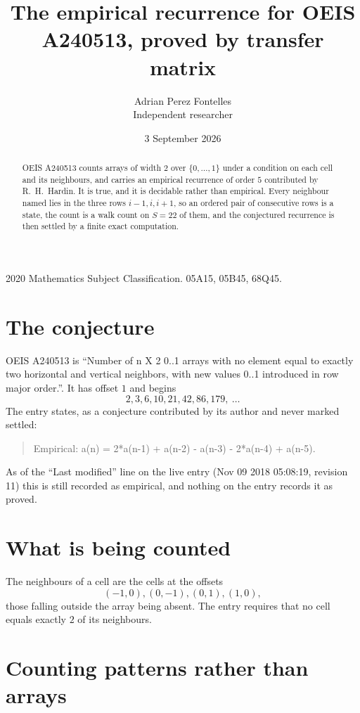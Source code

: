 \documentclass[11pt,a4paper]{article}
\title{The empirical recurrence for OEIS A240513, proved by transfer matrix}
\author{Adrian Perez Fontelles\\ \small Independent researcher}
\date{3 September 2026}
\theoremstyle{plain}
\theoremstyle{definition}
\begin{document}
\maketitle

\begin{abstract}
OEIS A240513 counts arrays of width $2$ over $\{0,\dots,1\}$ under a condition on each cell
and its neighbours, and carries an empirical recurrence of order $5$ contributed by
R.~H.~Hardin. It is true, and it is decidable rather than empirical. Every neighbour named lies
in the three rows $i-1,i,i+1$, so an ordered pair of consecutive rows is a state, the count is
a walk count on $S=22$ of them, and the conjectured recurrence is then settled by a finite
exact computation.
\end{abstract}

\noindent\small 2020 Mathematics Subject Classification. 05A15, 05B45, 68Q45.\normalsize

\section{The conjecture}

OEIS A240513 is ``Number of n X 2 0..1 arrays with no element equal to exactly two horizontal and vertical neighbors, with new values 0..1 introduced in row major order.''. It has offset $1$ and begins
\[
2, 3, 6, 10, 21, 42, 86, 179,\ \dots
\]
The entry states, as a conjecture contributed by its author and never marked settled:
\begin{quote}
Empirical: a(n) = 2*a(n-1) + a(n-2) - a(n-3) - 2*a(n-4) + a(n-5).
\end{quote}
As of the ``Last modified'' line on the live entry (Nov 09 2018 05:08:19, revision 11) this is still
recorded as empirical, and nothing on the entry records it as proved.

\section{What is being counted}

The neighbours of a cell are the cells at the offsets
\[
(-1,0), (0,-1), (0,1), (1,0),
\]
those falling outside the array being absent. The entry requires that no cell equals exactly $2$ of its neighbours.

\section{Counting patterns rather than arrays}
\end{document}
